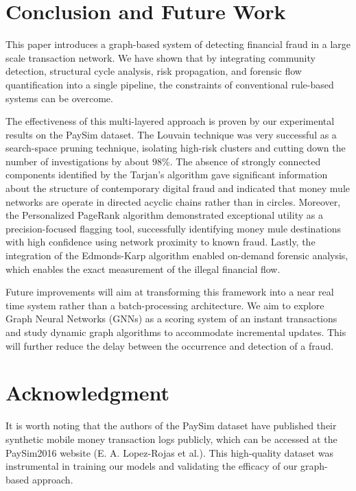 \documentclass[lettersize,journal]{IEEEtran}
\begin{document}
\section{Conclusion and Future Work}
This paper introduces a graph-based system of detecting financial fraud in a large scale transaction network. We have shown that by integrating community detection, structural cycle analysis, risk propagation, and forensic flow quantification into a single pipeline, the constraints of conventional rule-based systems can be overcome.

The effectiveness of this multi-layered approach is proven by our experimental results on the PaySim dataset. The Louvain technique was very successful as a search-space pruning technique, isolating high-risk clusters and cutting down the number of investigations by about 98\%. The absence of strongly connected components identified by the Tarjan's algorithm gave significant information about the structure of contemporary digital fraud and indicated that money mule networks are operate in directed acyclic chains rather than in circles. Moreover, the Personalized PageRank algorithm demonstrated exceptional utility as a precision-focused flagging tool, successfully identifying money mule destinations with high confidence using network proximity to known fraud. Lastly, the integration of the Edmonds-Karp algorithm enabled on-demand forensic analysis, which enables the exact measurement of the illegal financial flow.

Future improvements will aim at transforming this framework into a near real time system rather than a batch-processing architecture. We aim to explore Graph Neural Networks (GNNs) as a scoring system of an instant transactions and study dynamic graph algorithms to accommodate incremental updates. This will further reduce the delay between the occurrence and detection of a fraud.

\section*{Acknowledgment}

It is worth noting that the authors of the PaySim dataset have published their synthetic mobile money transaction logs publicly, which can be accessed at the PaySim2016 website (E. A. Lopez-Rojas et al.). This high-quality dataset was instrumental in training our models and validating the efficacy of our graph-based approach.
\end{document}
